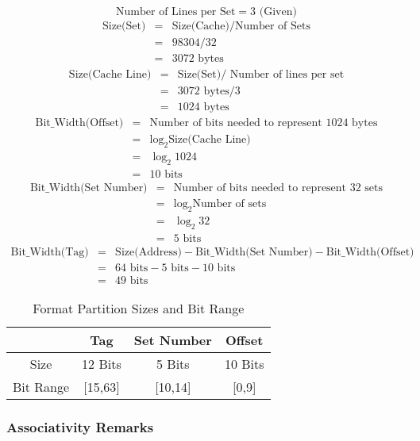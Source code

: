 \documentclass[11pt]{article}
\begin{document}
\[
	\text{Number of Lines per Set} = 3 \text{ (Given)}
\]
\begin{eqnarray*}
	\text{Size(Set)} &=& \text{Size(Cache)} / \text{Number of Sets}\\
		&=& 98304 / 32\\
		&=& 3072 \text{ bytes}
\end{eqnarray*}
\begin{eqnarray*}
	\text{Size(Cache Line)} &=& \text{Size(Set)} / \text{ Number of lines per set}\\
	&=& 3072 \text{ bytes} / 3\\
	&=& 1024 \text{ bytes}
\end{eqnarray*}
\begin{eqnarray*}
	\text{Bit\_Width(Offset)} &=& \text{Number of bits needed to represent 1024 bytes}\\
	&=& \log_2 \text{Size(Cache Line)}\\
	&=& \log_2 1024\\
	&=& 10 \text{ bits}
\end{eqnarray*}
\begin{eqnarray*}
	\text{Bit\_Width(Set Number)} &=& \text{Number of bits needed to represent 32 sets}\\
	&=& \log_2 \text{Number of sets}\\
	&=& \log_2 32\\
	&=& 5 \text{ bits}
\end{eqnarray*}
\begin{eqnarray*}
	\text{Bit\_Width(Tag)} &=& \text{Size(Address)} - \text{Bit\_Width(Set Number)} - \text{Bit\_Width(Offset)}\\
	&=& 64 \text{ bits} - 5 \text{ bits} - 10 \text{ bits}\\
	&=& 49 \text{ bits}
\end{eqnarray*}

\begin{table}[H]
	\centering
	\caption*{Format Partition Sizes and Bit Range}
	\begin{tabular}{| c | c | c | c |}
		\hline
					&	Tag		&	Set Number		&	Offset\\
		\hline
		Size			&	12 Bits		&	5 Bits		&	10 Bits\\
		\hline
		Bit Range		&	[15,63]		&	[10,14]		&	[0,9]\\
		\hline
	\end{tabular}
\end{table}

\subsubsection{Associativity Remarks}
\end{document}
